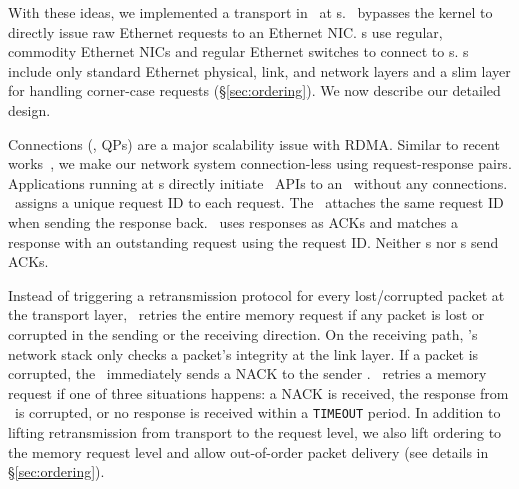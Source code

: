 With these ideas, we implemented a transport in \syslib\ at \CN{}s. \syslib\ bypasses the kernel to directly issue raw Ethernet requests to an Ethernet NIC.
\CN{}s use regular, commodity Ethernet NICs and regular Ethernet switches to connect to \MN{}s.
\MN{}s include only standard Ethernet physical, link, and network layers and a slim layer for handling corner-case requests (\S\ref{sec:ordering}).
We now describe our detailed design.


Connections (\ie, QPs) are a major scalability issue with RDMA.
Similar to recent works~\cite{Homa,1RMA}, we make our network system connection-less using request-response pairs.
Applications running at \CN{}s directly initiate \sys\ APIs to an \MN\ without any connections.
\syslib\ assigns a unique request ID to each request. The \MN\ attaches the same request ID when sending the response back. \syslib\ uses responses as ACKs and matches a response with an outstanding request using the request ID.
Neither \CN{}s nor \MN{}s send ACKs.

Instead of triggering a retransmission protocol for every lost/corrupted packet at the transport layer, 
\syslib\ retries the entire memory request if any packet is lost or corrupted in the sending or the receiving direction.
On the receiving path, \MN{}'s network stack only checks a packet's integrity at the link layer. If a packet is corrupted, the \MN\ immediately sends a NACK to the sender \CN.
\syslib\ retries a memory request if one of three situations happens: a NACK is received, the response from \MN\ is corrupted, or no response is received within a \texttt{TIMEOUT} period.
In addition to lifting retransmission from transport to the request level, we also lift ordering to the memory request level
and allow out-of-order packet delivery (see details in \S\ref{sec:ordering}). %

